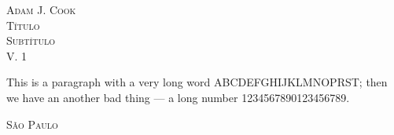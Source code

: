\clearpage
\thispagestyle{empty}

\begin{center}
\textsc{\LARGE Adam J. Cook}\\[2.5cm]
\textsc{\Large Título}\\
\textsc{\large Subtítulo}\\[1.0cm]
\textsc{\large V. 1}\\[1.0cm] %

\begin{sloppypar}
This is a paragraph with
a very long word ABCDEFGHIJKLMNOPRST;
then we have an another bad thing
--- a long number 1234567890123456789.

\blindtext
\end{sloppypar}

\vfill
\textsc{\large 
São Paulo \\
\the\year}

\end{center}